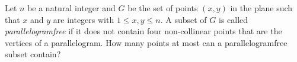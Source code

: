 Let $n$ be a natural integer and $G$ be the set of points $(x,y)$ in the plane
such that $x$ and $y$ are integers with $1\leq x,y\leq n$.
A subset of $G$ is called \textit{parallelogramfree} if it does not contain four
non-collinear points that are the vertices of a parallelogram.
How many points at most can a parallelogramfree subset contain? 
